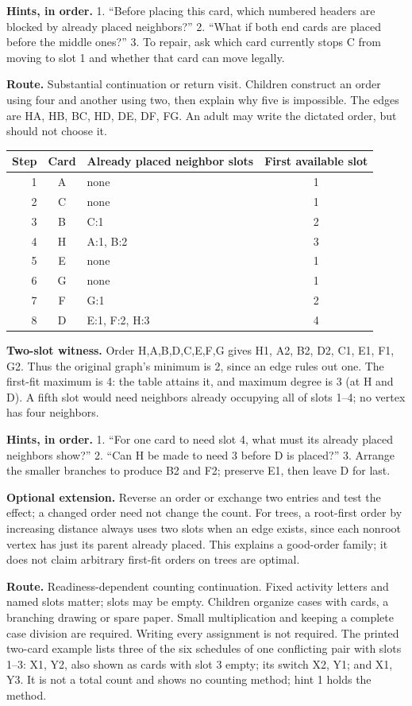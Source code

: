 \documentclass[10pt,letterpaper]{article}
\newcommand{\topic}[1]{\vspace{3pt}{\large\bfseries #1}\par}
\newcommand{\labelled}[2]{\textbf{#1} #2\par}
\newcommand{\hint}[1]{\textbf{Hints, in order.} #1\par}
\newcommand{\route}[1]{\textbf{Route.} #1\par}
\begin{document}
\hint{1. ``Before placing this card, which numbered headers are blocked by already placed neighbors?'' 2. ``What if both end cards are placed before the middle ones?'' 3. To repair, ask which card currently stops C from moving to slot 1 and whether that card can move legally.}
\topic{Student p. 8 / Problem 8: a tree can force first-fit to four}
\route{Substantial continuation or return visit. Children construct an order using four and another using two, then explain why five is impossible. The edges are HA, HB, BC, HD, DE, DF, FG. An adult may write the dictated order, but should not choose it.}
\begin{tabularx}{\linewidth}{@{}r c X c@{}}
\toprule
Step & Card & Already placed neighbor slots & First available slot \\
\midrule
1 & A & none & 1 \\
2 & C & none & 1 \\
3 & B & C:1 & 2 \\
4 & H & A:1, B:2 & 3 \\
5 & E & none & 1 \\
6 & G & none & 1 \\
7 & F & G:1 & 2 \\
8 & D & E:1, F:2, H:3 & 4 \\
\bottomrule
\end{tabularx}\par\smallskip
\labelled{Two-slot witness.}{Order H,A,B,D,C,E,F,G gives H1, A2, B2, D2, C1, E1, F1, G2. Thus the original graph's minimum is 2, since an edge rules out one. The first-fit maximum is 4: the table attains it, and maximum degree is 3 (at H and D). A fifth slot would need neighbors already occupying all of slots 1--4; no vertex has four neighbors.}
\hint{1. ``For one card to need slot 4, what must its already placed neighbors show?'' 2. ``Can H be made to need 3 before D is placed?'' 3. Arrange the smaller branches to produce B2 and F2; preserve E1, then leave D for last.}
\labelled{Optional extension.}{Reverse an order or exchange two entries and test the effect; a changed order need not change the count. For trees, a root-first order by increasing distance always uses two slots when an edge exists, since each nonroot vertex has just its parent already placed. This explains a good-order family; it does not claim arbitrary first-fit orders on trees are optimal.}
\newpage
\topic{Student p. 9 / Problem 9: count fixed-label assignments}
\route{Readiness-dependent counting continuation. Fixed activity letters and named slots matter; slots may be empty. Children organize cases with cards, a branching drawing or spare paper. Small multiplication and keeping a complete case division are required. Writing every assignment is not required. The printed two-card example lists three of the six schedules of one conflicting pair with slots 1--3: X1, Y2, also shown as cards with slot 3 empty; its switch X2, Y1; and X1, Y3. It is not a total count and shows no counting method; hint 1 holds the method.}
\end{document}
